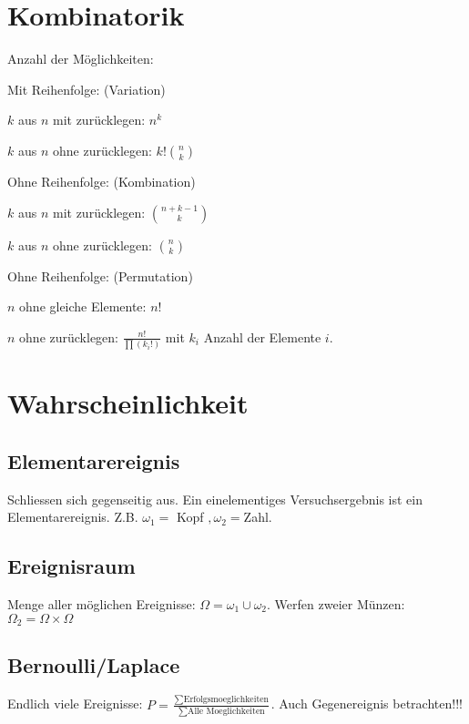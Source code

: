 \documentclass[10pt,a4paper]{article}
\newenvironment{packed_enum}{
\begin{enumerate}
  \setlength{\itemsep}{1pt}
  \setlength{\parskip}{0pt}
  \setlength{\parsep}{0pt}
}{\end{enumerate}}
\begin{document}
\section{Kombinatorik}
Anzahl der Möglichkeiten:
\begin{packed_enum}
\item Mit Reihenfolge: (Variation)
\begin{packed_enum}
\item $k$ aus $n$ mit zurücklegen: $n^k$
\item $k$ aus $n$ ohne zurücklegen: $k! \binom{n}{k}$
\end{packed_enum}
\item Ohne Reihenfolge: (Kombination)
\begin{packed_enum}
\item $k$ aus $n$ mit zurücklegen: $\binom {n+k-1}{k}$
\item $k$ aus $n$ ohne zurücklegen: $\binom{n}{k}$
\end{packed_enum}
\item Ohne Reihenfolge: (Permutation)
\begin{packed_enum}
\item $n$ ohne gleiche Elemente: $n!$
\item $n$ ohne zurücklegen: $\frac{n!}{\prod (k_i !)}$ mit $k_i$ Anzahl der Elemente $i$.
\end{packed_enum}
\end{packed_enum}

\section{Wahrscheinlichkeit}

\subsection{Elementarereignis}
Schliessen sich gegenseitig aus. Ein einelementiges Versuchsergebnis ist ein Elementarereignis. Z.B. $\omega_1 =$ Kopf $, \omega_2 =$Zahl.
\subsection{Ereignisraum}
Menge aller möglichen Ereignisse: $\Omega = \omega_1 \cup \omega_2$. Werfen zweier Münzen: $\Omega_2 = \Omega \times \Omega$

\subsection{Bernoulli/Laplace}
Endlich viele Ereignisse: $P = \frac{\sum \mbox{Erfolgsmoeglichkeiten}}{\sum \mbox{Alle Moeglichkeiten}}$. Auch Gegenereignis betrachten!!!
\end{document}
